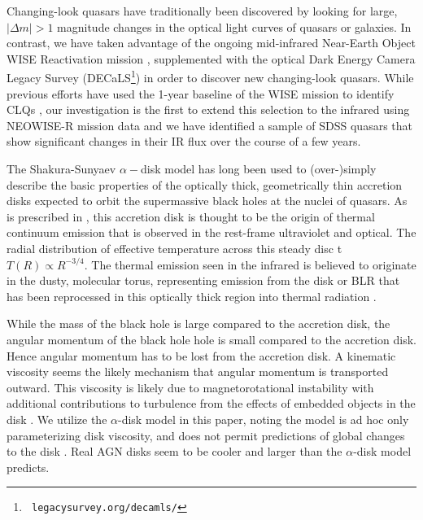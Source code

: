 \documentclass{nature}
\begin{document}
Changing-look quasars have traditionally been discovered by looking
for large, $| \Delta m | >1$ magnitude changes in the optical light curves
of quasars or galaxies. In contrast, we have taken advantage of the ongoing 
mid-infrared Near-Earth Object WISE Reactivation mission \cite[NEOWISE-R;
][]{Mainzer2014, Meisner2017a, Meisner2017b}, supplemented with the 
optical Dark Energy Camera Legacy Survey (DECaLS\footnote{{\tt
legacysurvey.org/decamls/}}) in order to discover new changing-look
quasars. While previous efforts have used the 1-year baseline of the
WISE mission to identify CLQs \cite[e.g.,][]{Assef2017}, our investigation 
is the first to extend this selection to the infrared using NEOWISE-R
mission data and we have identified a sample of SDSS quasars that
show significant changes in their IR flux over the course of a few
years. 

The Shakura-Sunyaev $\alpha-$disk model \cite{SS73} has long been used
to (over-)simply describe the basic properties of the optically thick,
geometrically thin accretion disks expected to orbit the supermassive
black holes at the nuclei of quasars. As is prescribed in
\cite{Pringle1981}, this accretion disk is thought to be the origin of
thermal continuum emission that is observed in the rest-frame
ultraviolet and optical.  The radial distribution of effective
temperature across this steady disc t $T(R) \propto R^{-3/4}$.  The
thermal emission seen in the infrared is believed to originate in the
dusty, molecular torus, representing emission from the disk or BLR
that has been reprocessed in this optically thick region into thermal
radiation \citep[see e.g.,][for reviews]{Antonucci1993, Perlman2008,
Lasota2016}.

While the mass of the black hole is large compared to the accretion
disk, the angular momentum of the black hole hole is small compared to
the accretion disk.  Hence angular momentum has to be lost from the
accretion disk.  A kinematic viscosity seems the likely mechanism that
angular momentum is transported outward.  This viscosity is likely due
to magnetorotational instability \citep[MRI][]{Balbus_Hawley1991} with
additional contributions to turbulence from the effects of embedded
objects in the disk \cite[e.g., ][]{McKernan2014}.  We utilize the
$\alpha$-disk model in this paper, noting the model is ad hoc only
parameterizing disk viscosity, and does not permit predictions of
global changes to the disk \cite{King2012}. Real AGN disks seem to be
cooler \cite[e.g., ][]{Lawrence2012} and larger
\cite[e.g.,][]{Pooley2007, Morgan2010, Morgan2012, Mosquera2011} than
the $\alpha$-disk model predicts.
\end{document}
